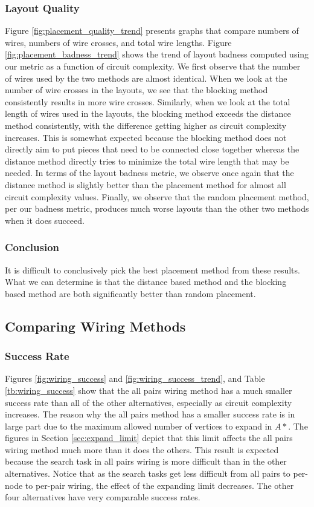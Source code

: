 \subsubsection{Layout Quality}
Figure
\ref{fig:placement_quality_trend} presents graphs that compare numbers of wires,
numbers of wire crosses, and total wire lengths.
Figure \ref{fig:placement_badness_trend} shows the trend of layout badness
computed using our metric as a function of circuit complexity.
We first observe that the
number of wires used by the two methods are almost identical. When
we look at the number of wire crosses in the layouts, we
see that the blocking method consistently results in more wire crosses.
Similarly,
when we look at the total length of wires used in the layouts, the blocking
method exceeds the distance method consistently, with the difference getting
higher as circuit complexity increases.
This is somewhat expected because the blocking method does not directly aim to
put pieces that need to be connected close together whereas the distance method
directly tries to minimize the total wire length that may be needed. In terms
of the layout badness metric, we observe once again that the distance method
is slightly better than the placement method for almost all circuit complexity
values. Finally, we observe that the random
placement method, per our badness metric, produces much worse layouts than the
other two methods when it does succeed.

\subsubsection{Conclusion}
It is difficult to conclusively pick the best placement method from these
results. What we can determine is that the distance based method and the
blocking based method are both significantly better than random placement.

\subsection{Comparing Wiring Methods}

\subsubsection{Success Rate}
Figures \ref{fig:wiring_success} and \ref{fig:wiring_success_trend}, and Table
\ref{tb:wiring_success} show that the all pairs wiring method has a much smaller
success rate than all of
the other alternatives, especially as circuit complexity increases. The reason
why the all pairs method has a smaller success rate is in
large part due to the maximum allowed number of vertices to expand in $A*$. The
figures in Section \ref{sec:expand_limit} depict that this limit affects
the all pairs wiring method much more than it does the others. This result is
expected because the search task in all pairs wiring is more difficult than in
the other alternatives. Notice that as the search tasks get less difficult from
all pairs to per-node to per-pair wiring, the effect of the expanding limit
decreases. The other four alternatives have very comparable success rates.

